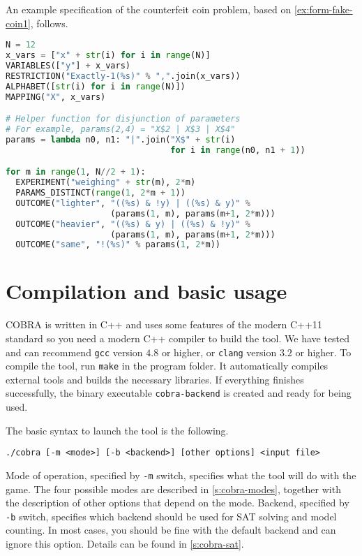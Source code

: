 \begin{example}
An example specification of the counterfeit coin problem,
based on \autoref{ex:form-fake-coin1}, follows.
\begin{lstlisting}[language=Python]
N = 12
x_vars = ["x" + str(i) for i in range(N)]
VARIABLES(["y"] + x_vars)
RESTRICTION("Exactly-1(%s)" % ",".join(x_vars))
ALPHABET([str(i) for i in range(N)])
MAPPING("X", x_vars)

# Helper function for disjunction of parameters
# For example, params(2,4) = "X$2 | X$3 | X$4"
params = lambda n0, n1: "|".join("X$" + str(i)
                                 for i in range(n0, n1 + 1))

for m in range(1, N//2 + 1):
  EXPERIMENT("weighing" + str(m), 2*m)
  PARAMS_DISTINCT(range(1, 2*m + 1))
  OUTCOME("lighter", "((%s) & !y) | ((%s) & y)" %
                     (params(1, m), params(m+1, 2*m)))
  OUTCOME("heavier", "((%s) & y) | ((%s) & !y)" %
                     (params(1, m), params(m+1, 2*m)))
  OUTCOME("same", "!(%s)" % params(1, 2*m))
\end{lstlisting}
\end{example}



\section{Compilation and basic usage}

COBRA is written in C++ and uses some features of the modern C++11 standard
  so you need a modern C++ compiler to build the tool.
We have tested and can recommend \texttt{gcc} version $4.8$ or higher,
  or \texttt{clang} version $3.2$ or higher.
To compile the tool, run
  \texttt{make}
  in the program folder.
It automatically compiles external tools and builds the necessary libraries.
If everything finishes successfully,
  the binary executable \texttt{cobra-backend} is created
  and ready for being used.

The basic syntax to launch the tool is the following.

\medskip
\centerline{\texttt{./cobra [-m <mode>] [-b <backend>] [other options] <input file>}}
\medskip


Mode of operation, specified by \texttt{-m} switch,
  specifies what the tool will do with the game.
The four possible modes are described in \autoref{s:cobra-modes},
  together with the description
  of other options that depend on the mode.
Backend, specified by \texttt{-b} switch, specifies which backend should be
  used for SAT solving and model counting.
In most cases, you should be fine with the default backend and can ignore this option.
Details can be found in \autoref{s:cobra-sat}.

